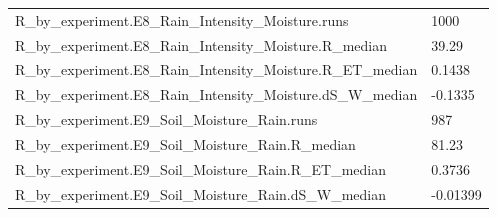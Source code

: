{\begin{longtable}{p{}p{}}
{}R\_by\_experiment.E8\_Rain\_Intensity\_Moisture.runs & 1000\\
{}R\_by\_experiment.E8\_Rain\_Intensity\_Moisture.R\_median & 39.29\\
{}R\_by\_experiment.E8\_Rain\_Intensity\_Moisture.R\_ET\_median & 0.1438\\
{}R\_by\_experiment.E8\_Rain\_Intensity\_Moisture.dS\_W\_median & -0.1335\\
{}R\_by\_experiment.E9\_Soil\_Moisture\_Rain.runs & 987\\
{}R\_by\_experiment.E9\_Soil\_Moisture\_Rain.R\_median & 81.23\\
{}R\_by\_experiment.E9\_Soil\_Moisture\_Rain.R\_ET\_median & 0.3736\\
{}R\_by\_experiment.E9\_Soil\_Moisture\_Rain.dS\_W\_median & -0.01399\\
\bottomrule\end{longtable}}

